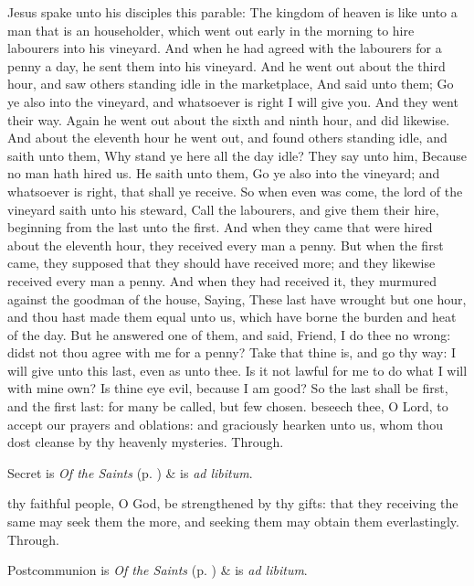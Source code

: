  Jesus spake unto his disciples this parable: The kingdom of heaven is like unto a man that is an householder, which went out early in the morning to hire labourers into his vineyard. And when he had agreed with the labourers for a penny a day, he sent them into his vineyard. And he went out about the third hour, and saw others standing idle in the marketplace, And said unto them; Go ye also into the vineyard, and whatsoever is right I will give you. And they went their way. Again he went out about the sixth and ninth hour, and did likewise. And about the eleventh hour he went out, and found others standing idle, and saith unto them, Why stand ye here all the day idle? They say unto him, Because no man hath hired us. He saith unto them, Go ye also into the vineyard; and whatsoever is right, that shall ye receive. So when even was come, the lord of the vineyard saith unto his steward, Call the labourers, and give them their hire, beginning from the last unto the first. And when they came that were hired about the eleventh hour, they received every man a penny. But when the first came, they supposed that they should have received more; and they likewise received every man a penny. And when they had received it, they murmured against the goodman of the house, Saying, These last have wrought but one hour, and thou hast made them equal unto us, which have borne the burden and heat of the day. But he answered one of them, and said, Friend, I do thee no wrong: didst not thou agree with me for a penny? Take that thine is, and go thy way: I will give unto this last, even as unto thee. Is it not lawful for me to do what I will with mine own? Is thine eye evil, because I am good? So the last shall be first, and the first last: for many be called, but few chosen.
\secret
{} beseech thee, O Lord, to accept our prayers and oblations: and graciously hearken unto us, whom thou dost cleanse by thy heavenly mysteries. Through.
\begin{rubric}
     Secret is \emph{Of the Saints} (p. \pageref{SPSaints}) \&  is \emph{ad libitum}.
\end{rubric}
\postcommunion
{} thy faithful people, O God, be strengthened by thy gifts: that they receiving the same may seek them the more, and seeking them may obtain them everlastingly. Through.
\begin{rubric}
     Postcommunion is \emph{Of the Saints} (p. \pageref{SPSaints}) \&  is \emph{ad libitum}.
\end{rubric}

